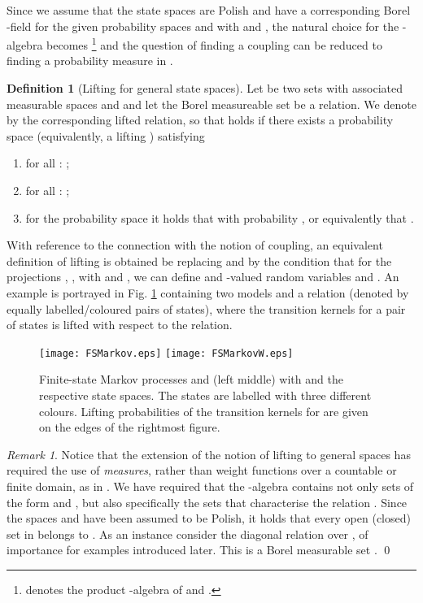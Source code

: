 \documentclass[letterpaper, 10 pt, conference]{amsart}
\theoremstyle{definition}
\newtheorem{defn}[definition]{Definition}
\theoremstyle{example}
\theoremstyle{remark}
\newtheorem{remark}{Remark}
\begin{document}
Since we assume that the state spaces are Polish and have a corresponding Borel -field for the given probability spaces  and  with 
    and , the natural choice for the -algebra becomes   \footnote{  denotes the product -algebra of  and .}  and the question of finding a coupling can be reduced to finding a probability measure in  .  
 
\begin{defn}[Lifting for general state spaces] \label{def:lifting}
Let  be two sets with associated measurable spaces  and  and let the Borel measureable set  be a relation. 
We denote by 
 the corresponding lifted relation, 
so that  holds if there exists a probability space  
(equivalently, a lifting ) satisfying 
{ \setlength{\parskip}{-1pt}\setlength{\parsep}{0pt} \begin{enumerate}
\item for all : ;
\item  for all :  ;
\item for the probability space   it holds that 
 with probability , or equivalently that .
\end{enumerate}}\noindent
\end{defn} 
\smallskip 
With reference to the connection with the notion of coupling, 
an equivalent definition of lifting is obtained be replacing  and  by the condition that for   the projections , , with  and , we can define  and -valued random variables  and . 
An example is portrayed in Fig. \ref{fig:lifting1} containing two models  and a relation (denoted by equally labelled/coloured pairs of states), where the transition kernels for a pair of states is lifted with respect to the relation. 
  \begin{figure}[htp] 
     \centering
     \texttt{[image: FSMarkov.eps]} 
     \texttt{[image: FSMarkovW.eps]} 
     \caption{ Finite-state Markov processes  and  (left  middle) with   and  the respective state spaces.  
   The states are labelled with three different colours.
   Lifting probabilities of the transition kernels for  are given on the edges of the rightmost figure.}\label{fig:lifting1}\end{figure}


\begin{remark}\label{rem:measdiag}
Notice that the extension of the notion of lifting to general spaces has required the use of \emph{measures}, 
rather than weight functions over a countable or finite domain, as in \cite{Segala1995}. 
We have required that the -algebra  contains not only sets of the form  and , 
but also specifically the sets that characterise the relation . 
Since the spaces  and  have been assumed to be Polish, 
it holds that every open (closed) set in  belongs to  \cite[Lemma 6.4.2]{bogachev2007measure}. 
As an instance consider the diagonal relation  over , 
of importance for examples introduced later. This is a Borel measurable set \cite[Theorem 6.5.7]{bogachev2007measure}. 
\qed
\end{remark}
\end{document}

